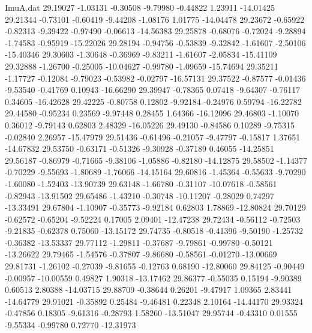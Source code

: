 \begin{filecontents}{ImuA.dat}
  29.19027   -1.03131   -0.30508   -9.79980   -0.44822    1.23911  -14.01425
  29.21344   -0.73101   -0.60419   -9.44208   -1.08176    1.01775  -14.04478
  29.23672   -0.65922   -0.82313   -9.39422   -0.97490   -0.06613  -14.56383
  29.25878   -0.68076   -0.72024   -9.28894   -1.74583   -0.95919  -15.22026
  29.28194   -0.94756   -0.53839   -9.32842   -1.61607   -2.50106  -15.40346
  29.30603   -1.30648   -0.36969   -9.83211   -1.61607   -2.05834  -15.41109
  29.32888   -1.26700   -0.25005  -10.04627   -0.99780   -1.09659  -15.74694
  29.35211   -1.17727   -0.12084   -9.79023   -0.53982   -0.02797  -16.57131
  29.37522   -0.87577   -0.01436   -9.53540   -0.41769    0.10943  -16.66290
  29.39947   -0.78365    0.07418   -9.64307   -0.76117    0.34605  -16.42628
  29.42225   -0.80758    0.12802   -9.92184   -0.24976    0.59794  -16.22782
  29.44580   -0.95234    0.23569   -9.97448    0.28455    1.64366  -16.12096
  29.46803   -1.10070    0.36012   -9.79143    0.62803    2.48329  -16.05226
  29.49130   -0.84586    0.10289   -9.75315   -0.02840    2.26957  -15.47979
  29.51436   -0.61496   -0.21057   -9.47797   -0.15817    1.37651  -14.67832
  29.53750   -0.63171   -0.51326   -9.30928   -0.37189    0.46055  -14.25851
  29.56187   -0.86979   -0.71665   -9.38106   -1.05886   -0.82180  -14.12875
  29.58502   -1.14377   -0.70229   -9.55693   -1.80689   -1.76066  -14.15164
  29.60816   -1.45364   -0.55633   -9.70290   -1.60080   -1.52403  -13.90739
  29.63148   -1.66780   -0.31107  -10.07618   -0.58561   -0.82943  -13.91502
  29.65486   -1.43210   -0.30748  -10.11207   -0.28029    0.74297  -13.33491
  29.67804   -1.10907   -0.35773   -9.92184    0.62803    1.78869  -12.80824
  29.70129   -0.62572   -0.65204   -9.52224    0.17005    2.09401  -12.47238
  29.72434   -0.56112   -0.72503   -9.21835   -0.62378    0.75060  -13.15172
  29.74735   -0.80518   -0.41396   -9.50190   -1.25732   -0.36382  -13.53337
  29.77112   -1.29811   -0.37687   -9.79861   -0.99780   -0.50121  -13.26622
  29.79465   -1.54576   -0.37807   -9.86680   -0.58561   -0.01270  -13.00669
  29.81731   -1.26102   -0.27039   -9.81655   -0.12763    0.68190  -12.80060
  29.84125   -0.90449   -0.00957  -10.00559    0.49827    1.90318  -13.17462
  29.86377   -0.55035    0.15194   -9.90389    0.60513    2.80388  -14.03715
  29.88709   -0.38644    0.26201   -9.47917    1.09365    2.83441  -14.64779
  29.91021   -0.35892    0.25484   -9.46481    0.22348    2.10164  -14.44170
  29.93324   -0.47856    0.18305   -9.61316   -0.28793    1.58260  -13.51047
  29.95744   -0.43310    0.01555   -9.55334   -0.99780    0.72770  -12.31973

\end{filecontents}
